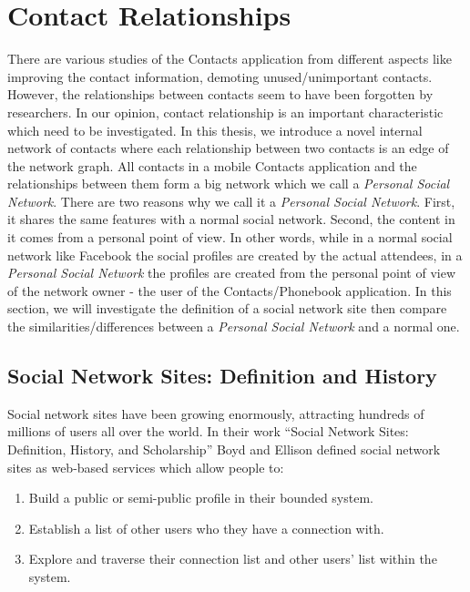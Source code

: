 \section{Contact Relationships}\label{contactrelationships}
There are various studies of the Contacts application from different aspects like improving the contact information, demoting unused/unimportant contacts. However, the relationships between contacts seem to have been forgotten by researchers. In our opinion, contact relationship is an important characteristic which need to be investigated. In this thesis, we introduce a novel internal network of contacts where each relationship between two contacts is an edge of the network graph. All contacts in a mobile Contacts application and the relationships between them form a big network which we call a \textit{Personal Social Network}. There are two reasons why we call it a \textit{Personal Social Network}. First, it shares the same features with a normal social network. Second, the content in it comes from a personal point of view. In other words, while in a normal social network like Facebook the social profiles are created by the actual attendees, in a \textit{Personal Social Network} the profiles are created from the personal point of view of the network owner - the user of the Contacts/Phonebook application. In this section, we will investigate the definition of a social network site then compare the similarities/differences between a \textit{Personal Social Network} and a normal one.

\subsection{Social Network Sites: Definition and History}
Social network sites have been growing enormously, attracting hundreds of millions of users all over the world. In their work ``Social Network Sites: Definition, History, and Scholarship'' \cite{boyd2010social} Boyd and Ellison defined social network sites as web-based services which allow people to:

\begin{enumerate}
  \item Build a public or semi-public profile in their bounded system.
  \item Establish a list of other users who they have a connection with.
  \item Explore and traverse their connection list and other users' list within the system.
\end{enumerate}


